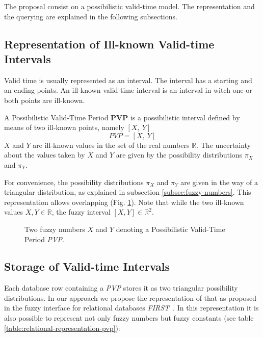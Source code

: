The proposal consist on a possibilistic valid-time model. The representation and the querying are explained in the following subsections.

\subsection{Representation of Ill-known Valid-time Intervals}
\label{subsec:representation-ill-known}
Valid time is usually represented as an interval. The interval has a starting and an ending points. An ill-known valid-time interval is an interval in witch one or both points are ill-known. 

\begin{definition}
A Possibilistic Valid-Time Period \textbf{PVP} is a possibilistic interval defined by means of two ill-known points, namely $\left[ X,\ Y \right]$
\begin{equation}
PVP = \left[X,\ Y \right] 
\end{equation}
$X$ and $Y$ are ill-known values in the set of the real numbers $\mathbb{R}$. The uncertainty about the values taken by $X$ and $Y$ are given by the possibility distributions $\pi_X$ and $\pi_Y$.
\end{definition}

For convenience, the possibility distributions $\pi_X$ and $\pi_Y$ are given in the way of a triangular distribution, as explained in subsection \ref{subsec:fuzzy-numbers}. This representation allows overlapping (Fig. \ref{fig:pvp}). Note that while the two ill-known values $X,Y \in \mathbb{R}$, the fuzzy interval  $[X,Y] \in \mathbb{R}^2$.


\begin{figure}[h!]
  \centering
  
  \caption{Two fuzzy numbers $X$ and $Y$ denoting a Possibilistic Valid-Time Period \emph{PVP}.}
  \label{fig:pvp}
\end{figure}

\subsection{Storage of Valid-time Intervals}
\label{subsec:storage}
Each database row containing a \emph{PVP} stores it as two triangular possibility distributions. In our approach we propose the representation of that as proposed in the  fuzzy interface for relational databases \emph{FIRST}~\cite{Medina94gefred.a,Gal98}. In this representation it is also possible to represent not only fuzzy numbers but fuzzy constants (see table \ref{table:relational-representation-pvp}):

